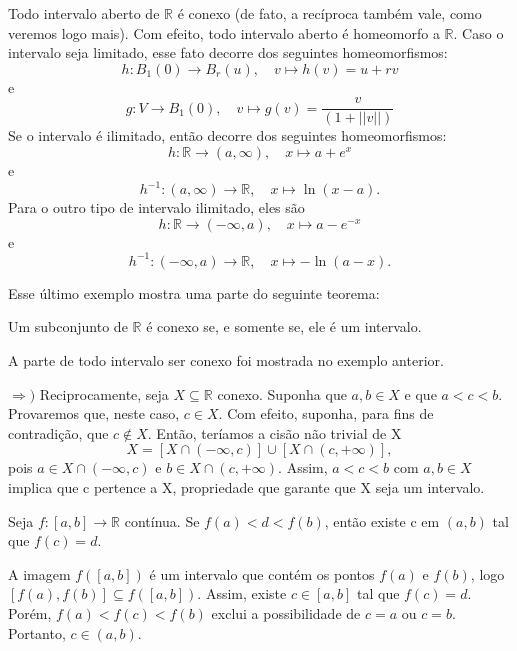 \documentclass[MetricSpaces/metric_notes.tex]{subfiles}
\begin{document}
\begin{example}
	Todo intervalo aberto de \(\mathbb{R}\) é conexo (de fato, a recíproca também vale, como veremos logo mais). Com efeito, todo intervalo
	aberto é homeomorfo a \(\mathbb{R}\). Caso o intervalo seja limitado, esse fato decorre dos seguintes homeomorfismos:
	\[
		h:B_{1}(0)\rightarrow B_{r}(u),\quad v\mapsto h(v) = u + rv
	\]
	e
	\[
		g:V\rightarrow B_{1}(0),\quad v\mapsto g(v) = \frac{v}{(1+||v||)}
	\]
	Se o intervalo é ilimitado, então decorre dos seguintes homeomorfismos:
	\[
		h:\mathbb{R}\rightarrow (a, \infty),\quad x\mapsto a + e^{x}
	\]
	e
	\[
		h^{-1}:(a, \infty)\rightarrow \mathbb{R},\quad x\mapsto \ln{(x-a)}.
	\]
	Para o outro tipo de intervalo ilimitado, eles são
	\[
		h:\mathbb{R}\rightarrow (-\infty, a),\quad x\mapsto a - e^{-x}
	\]
	e
	\[
		h^{-1}:(-\infty, a)\rightarrow \mathbb{R},\quad x\mapsto -\ln{(a-x)}.
	\]
\end{example}
Esse último exemplo mostra uma parte do seguinte teorema:
\begin{theorem*}
	Um subconjunto de \(\mathbb{R}\) é conexo se, e somente se, ele é um intervalo.
\end{theorem*}
\begin{proof*}
	A parte de todo intervalo ser conexo foi mostrada no exemplo anterior.

	\(\Rightarrow )\) Reciprocamente, seja \(X\subseteq{\mathbb{R}}\) conexo. Suponha que \(a, b\in X\) e que
	\(a < c < b.\) Provaremos que, neste caso, \(c\in X\). Com efeito, suponha, para fins de contradição, que
	\(c\not\in X.\) Então, teríamos a cisão não trivial de X
	\[
		X = [X\cap(-\infty, c)]\cup[X\cap(c, +\infty)],
	\]
	pois \(a\in X\cap(-\infty, c)\) e \(b\in X\cap(c, +\infty).\) Assim, \(a < c < b\) com \(a, b\in X\) implica que c pertence a X, propriedade que
	garante que X seja um intervalo. \qedsymbol
\end{proof*}
\hypertarget{intermediate_value}{\begin{crl*}
		Seja \(f:[a, b]\rightarrow \mathbb{R}\) contínua. Se \(f(a) < d < f(b)\), então existe c em \((a, b)\) tal que \(f(c) = d.\)
	\end{crl*}}
\begin{proof*}
	A imagem \(f([a, b])\) é um intervalo que contém os pontos \(f(a)\) e \(f(b)\), logo \([f(a), f(b)]\subseteq{f([a, b])}.\) Assim,
	existe \(c\in[a, b]\) tal que \(f(c) = d\). Porém, \(f(a) < f(c) < f(b)\) exclui a possibilidade de \(c = a\) ou \(c = b\). Portanto,
	\(c\in (a, b)\). \qedsymbol
\end{proof*}
\end{document}
